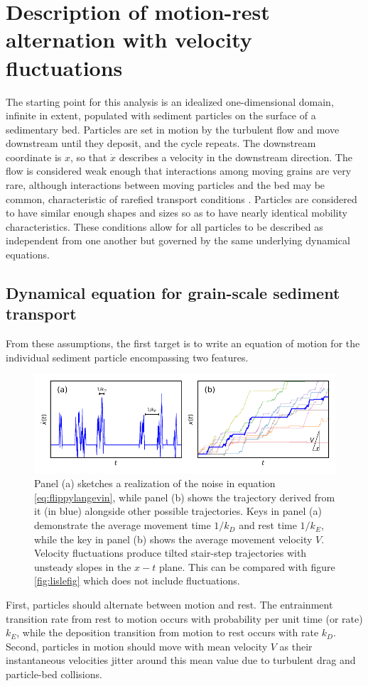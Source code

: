 \section{Description of motion-rest alternation with velocity fluctuations \label{sec:mod}}
The starting point for this analysis is an idealized one-dimensional domain, infinite in extent, populated with sediment particles on the surface of a sedimentary bed.
Particles are set in motion by the turbulent flow and move downstream until they deposit, and the cycle repeats.
The downstream coordinate is $x$, so that $\dot{x}$ describes a velocity in the downstream direction.
The flow is considered weak enough that interactions among moving grains are very rare, although interactions between moving particles and the bed may be common, characteristic of rarefied transport conditions \citep[e.g.][]{Kumaran2006,Furbish2017}. 
Particles are considered to have similar enough shapes and sizes so as to have nearly identical mobility characteristics.
These conditions allow for all particles to be described as independent from one another but governed by the same underlying dynamical equations.

\subsection{Dynamical equation for grain-scale sediment transport}
From these assumptions, the first target is to write an equation of motion for the individual sediment particle encompassing two features.
\begin{figure}
	\centerline{\includegraphics{./figures/ch2/fig0mod.pdf}}
	\caption{Panel (a) sketches a realization of the noise in equation \ref{eq:flippylangevin}, while panel (b) shows the trajectory derived from it (in blue) alongside other possible trajectories. Keys in panel (a) demonstrate the average movement time $1/k_D$ and rest time $1/k_E$, while the key in panel (b) shows the average movement velocity $V$. Velocity fluctuations produce tilted stair-step trajectories with unsteady slopes in the $x-t$ plane. This can be compared with figure \ref{fig:lislefig} which does not include fluctuations.}
	\label{fig:fluxxy0}
\end{figure}
First, particles should alternate between motion and rest.
The entrainment transition rate from rest to motion occurs with probability per unit time (or rate) $k_E$, while the deposition transition from motion to rest occurs with rate $k_D$.
Second, particles in motion should move with mean velocity $V$ as their instantaneous velocities jitter around this mean value due to turbulent drag and particle-bed collisions.


